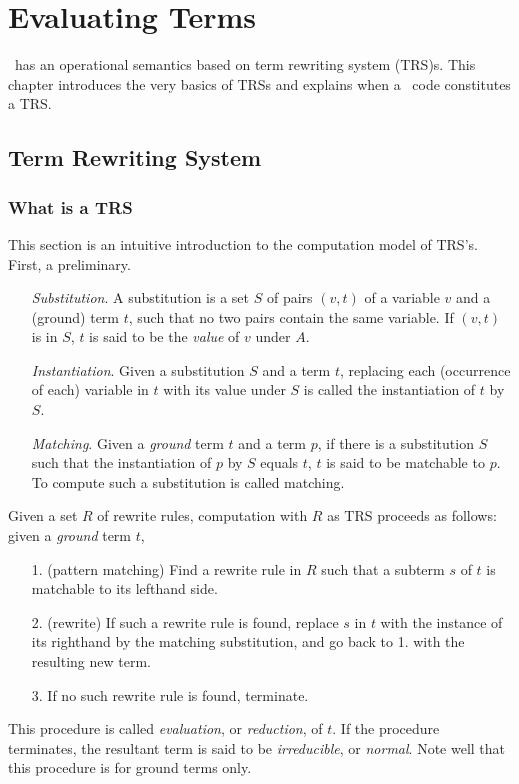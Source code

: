 \documentclass[a4paper]{memoir}
\begin{document}
\chapter{Evaluating Terms}\label{sec:p2-term-evaluation}

\cafeobj~has an operational semantics based on term rewriting system
(TRS)s. This chapter introduces the very basics of TRSs and explains
when a \cafeobj~code constitutes a TRS.

\section{Term Rewriting System}\label{sec:p2-trs}

\subsection{What is a TRS}\label{sec:p2-trs-basic}

This section is an intuitive introduction to the computation model of
TRS's. First, a preliminary.

\begin{itemize}
\item[] {\em Substitution}. 
  A substitution is a set $S$ of pairs $(v,t)$ of a variable $v$ and a
  (ground) term $t$, such that no two pairs contain the same variable.
  If $(v,t)$ is in $S$, $t$ is said to be the {\em value} of $v$ under
  $A$.
\item[] {\em Instantiation}.
  Given a substitution $S$ and a term $t$, replacing each (occurrence of
  each) variable in $t$ with its value under $S$ is called the
  instantiation of $t$ by $S$.
\item[] {\em Matching}. Given a {\em ground} term
   $t$ and a
  term $p$, if there is a substitution $S$ such that the instantiation
  of $p$ by $S$ equals $t$, $t$ is said to be matchable to $p$.
  To compute such a substitution is called matching.
\end{itemize}
Given a set $R$ of rewrite rules, computation with $R$ as TRS
proceeds as follows: given a {\em ground} term $t$,
\begin{itemize}
\item[1.] (pattern matching) Find a rewrite rule in $R$ such that a
 subterm $s$ of $t$
 is matchable to its lefthand side.
\item[2.] (rewrite) If such a rewrite rule is found, replace
 $s$ in $t$ with
 the instance of its righthand by the matching substitution, and
 go back to 1. with the resulting new term.
\item[3.] If no such rewrite rule is found, terminate.
\end{itemize}
This procedure is called {\em evaluation},
or {\em reduction}, of $t$. If the procedure terminates,
the resultant term is said to be {\em irreducible},
or {\em normal}.
Note well that this procedure is for ground terms only.
\end{document}
